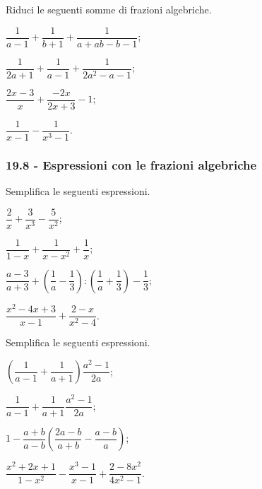 \begin{esercizio}[\Ast]
\label{ese:19.30}
Riduci le seguenti somme di frazioni algebriche.
\begin{multicols}{2}
\begin{enumeratea}
 \item $\dfrac{1}{a-1}+\dfrac{1}{b+1}+\dfrac{1}{a+ab-b-1}$;
 \item $\dfrac{1}{2a+1}+\dfrac{1}{a-1}+\dfrac{1}{2a^{2}-a-1}$;
 \item $\dfrac{2x-3}{x}+\dfrac{-2x}{2x+3}-1$;
 \item $\dfrac{1}{x-1}-\dfrac{1}{x^{3}-1}$.
\end{enumeratea}
\end{multicols}
\end{esercizio}

\subsubsection*{19.8 - Espressioni con le frazioni algebriche}

\begin{esercizio}[\Ast]
Semplifica le seguenti espressioni.
\begin{multicols}{2}
\begin{enumeratea}
 \item $\dfrac{2}{x}+\dfrac{3}{x^{3}}-\dfrac{5}{x^{2}}$;
 \item $\dfrac{1}{1-x}+\dfrac{1}{x-x^{2}}+\dfrac{1}{x}$;
 \item $\dfrac{a-3}{a+3}+\left(\dfrac{1}{a}-\dfrac{1}{3}\right):\left(\dfrac{1}{a}+\dfrac{1}{3}\right)-\dfrac{1}{3}$;
 \item $\dfrac{x^{2}-4x+3}{x-1}+\dfrac{2-x}{x^{2}-4}$.
\end{enumeratea}
\end{multicols}
\end{esercizio}
\begin{esercizio}[\Ast]
Semplifica le seguenti espressioni.
\begin{multicols}{2}
\begin{enumeratea}
 \item $\left(\dfrac{1}{a-1}+\dfrac{1}{a+1}\right)\dfrac{a^{2}-1}{2a}$;
 \item $\dfrac{1}{a-1}+\dfrac{1}{a+1}\dfrac{a^{2}-1}{2a}$;
 \item $1-\dfrac{a+b}{a-b} \left(\dfrac{2a-b}{a+b}-\dfrac{a-b}{a}\right)$;
 \item $\dfrac{x^{2}+2x+1}{1-x^{2}}-\dfrac{x^{3}-1}{x-1}+\dfrac{2-8x^{2}}{4x^{2}-1}$.
\end{enumeratea}
\end{multicols}
\end{esercizio}

